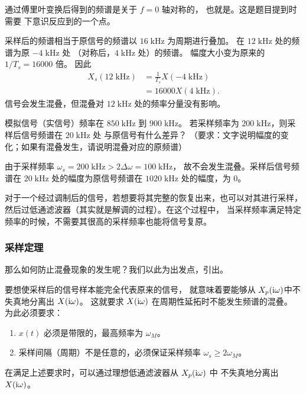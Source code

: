 \begin{note}
    通过傅里叶变换后得到的频谱是关于 $f = 0$ 轴对称的，
    也就是。这是题目提到时需要
    下意识反应到的一个点。
\end{note}

\begin{solution}
    采样后的频谱相当于原信号的频谱以 $16\;\mathrm{kHz}$ 为周期进行叠加。
    在 $12\;\mathrm{kHz}$ 处的频谱为原 $-4\;\mathrm{kHz}$ 处
    （对称后，$4\;\mathrm{kHz}$ 处）的频谱。
    幅度大小变为原来的 $1/T_s = 16000$ 倍。
    因此
    \begin{align*}
        X_s(12\;\mathrm{kHz}) & = \frac{1}{T_s}X(-4\;\mathrm{kHz}) \\
        & = 16000X(4\;\mathrm{kHz}).
    \end{align*}
    信号会发生混叠，但混叠对 $12\;\mathrm{kHz}$ 处的频率分量没有影响。
\end{solution}

\begin{example}
    模拟信号（实信号）频率在 $850\;\mathrm{kHz}$ 到 $900\;\mathrm{kHz}$。
    若采样频率为 $200\;\mathrm{kHz}$，则采样后信号频谱在 $20\;\mathrm{kHz}$ 处
    与原信号有什么差异？
    （要求：文字说明幅度的变化；如果有混叠发生，请说明混叠对应的原频谱）
\end{example}

\begin{solution}
    由于采样频率 $\omega_s = 200\;\mathrm{kHz} > 2\Delta\omega = 100\;\mathrm{kHz}$，
    故不会发生混叠。采样后信号频谱在 $20\;\mathrm{kHz}$ 处的幅度为原信号频谱在
    $1020\;\mathrm{kHz}$ 处的幅度，为 $0$。
\end{solution}

\begin{remark}
    对于一个经过调制后的信号，若想要将其完整的恢复出来，也可以对其进行采样，
    然后过低通滤波器（其实就是解调的过程）。在这个过程中，
    当采样频率满足特定频率的时候，不需要其很高的采样频率也能将信号复原。
\end{remark}

\subsubsection{采样定理}

那么如何防止混叠现象的发生呢？我们以此为出发点，引出。

要想使采样后的信号样本能完全代表原来的信号，
就意味着要能够从 $X_p(\mathrm{i} \omega)$中不失真地分离出 $X(\mathrm{i} \omega)$。
这就要求 $X(\mathrm{i} \omega)$ 在周期性延拓时不能发生频谱的混叠。
为此必须要求：
\begin{enumerate}
    \item $x(t)$ 必须是带限的，最高频率为 $\omega_M$。
    \item 采样间隔（周期）不是任意的，必须保证采样频率 $\omega_s \ge 2\omega_M$。
\end{enumerate}
在满足上述要求时，可以通过理想低通滤波器从 $X_p(\mathrm{i} \omega)$ 中
不失真地分离出 $X(\mathrm{i} \omega)$。

